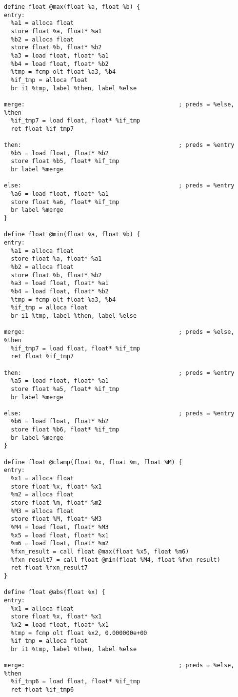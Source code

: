 \documentclass[main.tex]{subfiles}
\begin{document}
{\begin{lstlisting}
define float @max(float %a, float %b) {
entry:
  %a1 = alloca float
  store float %a, float* %a1
  %b2 = alloca float
  store float %b, float* %b2
  %a3 = load float, float* %a1
  %b4 = load float, float* %b2
  %tmp = fcmp olt float %a3, %b4
  %if_tmp = alloca float
  br i1 %tmp, label %then, label %else

merge:                                            ; preds = %else, %then
  %if_tmp7 = load float, float* %if_tmp
  ret float %if_tmp7

then:                                             ; preds = %entry
  %b5 = load float, float* %b2
  store float %b5, float* %if_tmp
  br label %merge

else:                                             ; preds = %entry
  %a6 = load float, float* %a1
  store float %a6, float* %if_tmp
  br label %merge
}

define float @min(float %a, float %b) {
entry:
  %a1 = alloca float
  store float %a, float* %a1
  %b2 = alloca float
  store float %b, float* %b2
  %a3 = load float, float* %a1
  %b4 = load float, float* %b2
  %tmp = fcmp olt float %a3, %b4
  %if_tmp = alloca float
  br i1 %tmp, label %then, label %else

merge:                                            ; preds = %else, %then
  %if_tmp7 = load float, float* %if_tmp
  ret float %if_tmp7

then:                                             ; preds = %entry
  %a5 = load float, float* %a1
  store float %a5, float* %if_tmp
  br label %merge

else:                                             ; preds = %entry
  %b6 = load float, float* %b2
  store float %b6, float* %if_tmp
  br label %merge
}

define float @clamp(float %x, float %m, float %M) {
entry:
  %x1 = alloca float
  store float %x, float* %x1
  %m2 = alloca float
  store float %m, float* %m2
  %M3 = alloca float
  store float %M, float* %M3
  %M4 = load float, float* %M3
  %x5 = load float, float* %x1
  %m6 = load float, float* %m2
  %fxn_result = call float @max(float %x5, float %m6)
  %fxn_result7 = call float @min(float %M4, float %fxn_result)
  ret float %fxn_result7
}

define float @abs(float %x) {
entry:
  %x1 = alloca float
  store float %x, float* %x1
  %x2 = load float, float* %x1
  %tmp = fcmp olt float %x2, 0.000000e+00
  %if_tmp = alloca float
  br i1 %tmp, label %then, label %else

merge:                                            ; preds = %else, %then
  %if_tmp6 = load float, float* %if_tmp
  ret float %if_tmp6


\end{lstlisting}}
\end{document}
